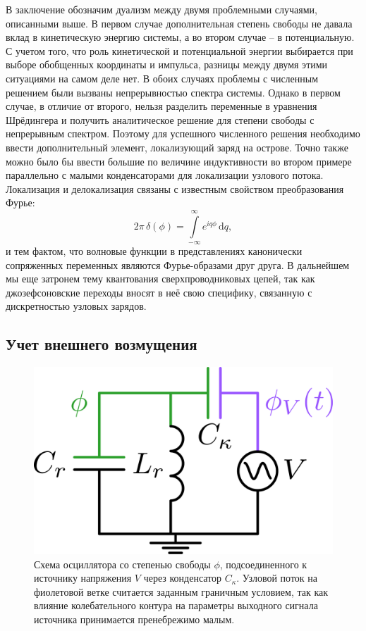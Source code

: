\documentclass[14pt, a4paper]{extreport}
\newcommand{\diff}{\,\mathrm{d}}
\numberwithin{equation}{section}
\begin{document}
В заключение обозначим дуализм между двумя проблемными случаями, описанными выше. В первом случае дополнительная степень свободы не давала вклад в кинетическую энергию системы, а во втором случае -- в потенциальную. С учетом того, что роль кинетической и потенциальной энергии выбирается при выборе обобщенных координаты и импульса, разницы между двумя этими ситуациями на самом деле нет. В обоих случаях проблемы с численным решением были вызваны непрерывностью спектра системы. Однако в первом случае, в отличие от второго, нельзя разделить переменные в уравнения Шрёдингера и получить аналитическое решение для степени свободы с непрерывным спектром. Поэтому для успешного численного решения необходимо ввести дополнительный элемент, локализующий заряд на острове. Точно также можно было бы ввести большие по величине индуктивности во втором примере параллельно с малыми конденсаторами для локализации узлового потока. Локализация и делокализация связаны с известным свойством преобразования Фурье:
\begin{equation}
	2\pi\, \delta(\phi) = \int\limits_{-\infty}^{\infty} e^{iq\phi} \diff q,
\end{equation}
и тем фактом, что волновые функции в представлениях канонически сопряженных переменных являются Фурье-образами друг друга. В дальнейшем мы еще затронем тему квантования сверхпроводниковых цепей, так как джозефсоновские переходы вносят в неё свою специфику, связанную с дискретностью узловых зарядов.

\subsection{Учет внешнего возмущения}\label{sec:driven_lc}


\begin{figure}[b]
	\centering
	\includegraphics[width=0.4\linewidth]{Pictures/LC_driven}
	\caption{Схема осциллятора со степенью свободы $\phi$, подсоединенного к источнику напряжения $V$ через конденсатор $C_\kappa$. Узловой поток на фиолетовой ветке считается заданным граничным условием, так как влияние колебательного контура на параметры выходного сигнала источника принимается пренебрежимо малым.}
	\label{fig:lcdriven}
\end{figure}
\end{document}
